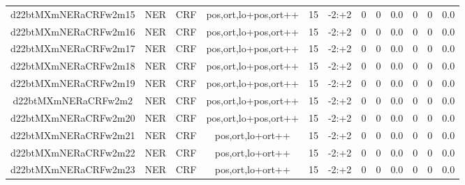 \documentclass[a4paper]{article}
\begin{document}
\begin{landscape}
\begin{center}
\begin{tabular}{ |c|c|c|c|c|c|c|c|c|c|c|c|}
 
 	
 	\small{ d22btMXmNERaCRFw2m15 } & \small{ NER} & \small{  CRF }  & pos,ort,lo+pos,ort++  &  15 &  \small{  -2:+2 }  &  0 & 0 & 0.0  &  0 & 0 & 0.0 \\
 	

 
 	
 	\small{ d22btMXmNERaCRFw2m16 } & \small{ NER} & \small{  CRF }  & pos,ort,lo+pos,ort++  &  15 &  \small{  -2:+2 }  &  0 & 0 & 0.0  &  0 & 0 & 0.0 \\
 	

 
 	
 	\small{ d22btMXmNERaCRFw2m17 } & \small{ NER} & \small{  CRF }  & pos,ort,lo+pos,ort++  &  15 &  \small{  -2:+2 }  &  0 & 0 & 0.0  &  0 & 0 & 0.0 \\
 	

 
 	
 	\small{ d22btMXmNERaCRFw2m18 } & \small{ NER} & \small{  CRF }  & pos,ort,lo+pos,ort++  &  15 &  \small{  -2:+2 }  &  0 & 0 & 0.0  &  0 & 0 & 0.0 \\
 	

 
 	
 	\small{ d22btMXmNERaCRFw2m19 } & \small{ NER} & \small{  CRF }  & pos,ort,lo+pos,ort++  &  15 &  \small{  -2:+2 }  &  0 & 0 & 0.0  &  0 & 0 & 0.0 \\
 	

 
 	
 	\small{ d22btMXmNERaCRFw2m2 } & \small{ NER} & \small{  CRF }  & pos,ort,lo+pos,ort++  &  15 &  \small{  -2:+2 }  &  0 & 0 & 0.0  &  0 & 0 & 0.0 \\
 	

 
 	
 	\small{ d22btMXmNERaCRFw2m20 } & \small{ NER} & \small{  CRF }  & pos,ort,lo+pos,ort++  &  15 &  \small{  -2:+2 }  &  0 & 0 & 0.0  &  0 & 0 & 0.0 \\
 	

 
 	
 	\small{ d22btMXmNERaCRFw2m21 } & \small{ NER} & \small{  CRF }  & pos,ort,lo+ort++  &  15 &  \small{  -2:+2 }  &  0 & 0 & 0.0  &  0 & 0 & 0.0 \\
 	

 
 	
 	\small{ d22btMXmNERaCRFw2m22 } & \small{ NER} & \small{  CRF }  & pos,ort,lo+ort++  &  15 &  \small{  -2:+2 }  &  0 & 0 & 0.0  &  0 & 0 & 0.0 \\
 	

 
 	
 	\small{ d22btMXmNERaCRFw2m23 } & \small{ NER} & \small{  CRF }  & pos,ort,lo+ort++  &  15 &  \small{  -2:+2 }  &  0 & 0 & 0.0  &  0 & 0 & 0.0 \\
 	


\end{tabular}
\end{center}
\end{landscape}
\end{document}
